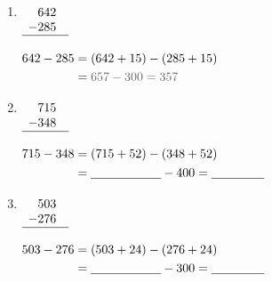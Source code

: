 \documentclass{article}
\begin{document}
\begin{enumerate}[label=\textbf{\arabic*.}, itemsep=2em, leftmargin=2em]

  \item 
  \begin{minipage}[t]{0.28\linewidth}
    $\begin{array}[t]{r@{\quad}l}
        642 \\
      - 285 \\
      \hline
    \end{array}$
  \end{minipage}%
  \begin{minipage}[t]{0.68\linewidth}
    $\begin{aligned}[t]
      642 - 285 &= (642 + 15) - (285 + 15) \\
                &= {\color{subtext}657 - 300 = 357}
    \end{aligned}$
  \end{minipage}

  \item 
  \begin{minipage}[t]{0.28\linewidth}
    $\begin{array}[t]{r@{\quad}l}
        715 \\
      - 348 \\
      \hline
    \end{array}$
  \end{minipage}%
  \begin{minipage}[t]{0.68\linewidth}
    $\begin{aligned}[t]
      715 - 348 &= (715 + 52) - (348 + 52) \\
                &= \underline{\hspace{2cm}} - 400 = \underline{\hspace{1.5cm}}
    \end{aligned}$
  \end{minipage}

  \item 
  \begin{minipage}[t]{0.28\linewidth}
    $\begin{array}[t]{r@{\quad}l}
        503 \\
      - 276 \\
      \hline
    \end{array}$
  \end{minipage}%
  \begin{minipage}[t]{0.68\linewidth}
    $\begin{aligned}[t]
      503 - 276 &= (503 + 24) - (276 + 24) \\
                &= \underline{\hspace{2cm}} - 300 = \underline{\hspace{1.5cm}}
    \end{aligned}$
  \end{minipage}


\end{enumerate}
\end{document}
